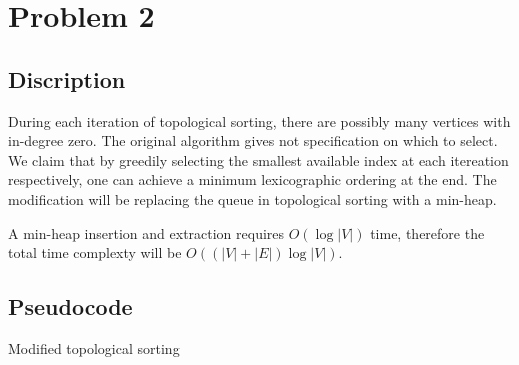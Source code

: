 \documentclass{report}
\begin{document}
    \section*{Problem 2}
    \subsection*{Discription}
    During each iteration of topological sorting, there are possibly many vertices with 
    in-degree zero. The original algorithm gives not specification on which to select. 
    We claim that by greedily selecting the smallest available index at each itereation 
    respectively, one can achieve a minimum lexicographic ordering at the end.
    The modification will be replacing the queue in topological sorting with a min-heap. 

    A min-heap insertion and extraction requires $O(\log |V|)$ time, therefore 
    the total time complexty will be $O((|V| + |E|) \log |V|)$.
    \newpage
    \subsection*{Pseudocode}
    \begin{algorithm}
        \caption{Modified topological sorting}
        \begin{algorithmic}[1]
                \EndIf{}
            \EndFor{}
                    \EndIf{}
                \EndFor{}
            \EndWhile{}
        \end{algorithmic}
    \end{algorithm}
\end{document}
